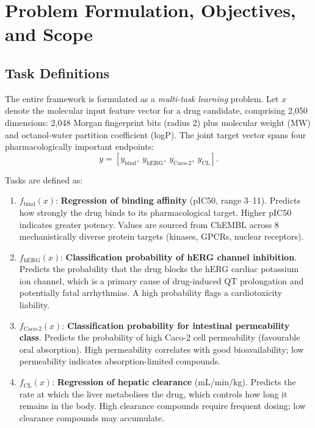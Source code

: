 \documentclass[a4paper,11pt,twoside]{report}
\begin{document}
\chapter{Problem Formulation, Objectives, and Scope}

\section{Task Definitions}

The entire framework is formulated as a \textit{multi-task learning} problem. Let $x$ denote the molecular input feature vector for a drug candidate, comprising 2,050 dimensions: 2,048 Morgan fingerprint bits (radius 2) plus molecular weight (MW) and octanol-water partition coefficient (logP). The joint target vector spans four pharmacologically important endpoints:
\begin{equation}
y = \left[y_{\text{bind}},\ y_{\text{hERG}},\ y_{\text{Caco-2}},\ y_{\text{CL}}\right].
\end{equation}

Tasks are defined as:
\begin{enumerate}
\item $f_{\text{bind}}(x)$: \textbf{Regression of binding affinity} (pIC50, range 3--11). Predicts how strongly the drug binds to its pharmacological target. Higher pIC50 indicates greater potency. Values are sourced from ChEMBL across 8 mechanistically diverse protein targets (kinases, GPCRs, nuclear receptors).

\item $f_{\text{hERG}}(x)$: \textbf{Classification probability of hERG channel inhibition}. Predicts the probability that the drug blocks the hERG cardiac potassium ion channel, which is a primary cause of drug-induced QT prolongation and potentially fatal arrhythmias. A high probability flags a cardiotoxicity liability.

\item $f_{\text{Caco-2}}(x)$: \textbf{Classification probability for intestinal permeability class}. Predicts the probability of high Caco-2 cell permeability (favourable oral absorption). High permeability correlates with good bioavailability; low permeability indicates absorption-limited compounds.

\item $f_{\text{CL}}(x)$: \textbf{Regression of hepatic clearance} (mL/min/kg). Predicts the rate at which the liver metabolises the drug, which controls how long it remains in the body. High clearance compounds require frequent dosing; low clearance compounds may accumulate.
\end{enumerate}
\end{document}

